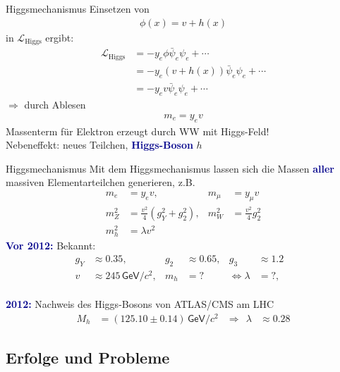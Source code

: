 \documentclass[hyperref={pdfpagelabels=false},ngerman]{beamer}
\newcommand{\eh}[1]{\,\mathsf{#1}}
\newcommand{\Lagr}{\mathcal{L}}
\renewcommand{\emph}[1]{\textbf{\textcolor{darkblue}{#1}}}
\newcommand{\GeV}{\eh{GeV}}
\begin{document}
\begin{frame}{Higgsmechanismus}
  Einsetzen von
  \begin{align*}
    \phi(x) = v + h(x)
  \end{align*}
  in $\Lagr_{\text{Higgs}}$ ergibt:
  \begin{align*}
    \Lagr_{\text{Higgs}}
    &= - y_e \phi \bar{\psi}_e \psi_e + \cdots \\
    &= - y_e (v + h(x)) \bar{\psi}_e \psi_e + \cdots \\
    &= - y_e v \bar{\psi}_e \psi_e + \cdots
  \end{align*}
  $\Rightarrow$ durch Ablesen
  \begin{align*}
    m_e = y_e v
  \end{align*}
  Massenterm für Elektron erzeugt durch WW mit Higgs-Feld!\\
  Nebeneffekt: neues Teilchen, \emph{Higgs-Boson} $h$
\end{frame}

\begin{frame}{Higgsmechanismus}
  Mit dem Higgsmechanismus lassen sich die Massen \emph{aller}
  massiven Elementarteilchen generieren, z.B.
  \begin{align*}
    m_e &= y_e v, & m_\mu &= y_\mu v \\
    m_Z^2 &= \frac{v^2}{4}(g_Y^2 + g_2^2) , &  m_W^2 &= \frac{v^2}{4} g_2^2 \\
    m_h^2 &= \lambda v^2
  \end{align*}
  \emph{Vor 2012:}
  Bekannt:
  \begin{align*}
    g_Y &\approx 0.35, &
    g_2 &\approx 0.65, &
    g_3 &\approx 1.2 \\
    v &\approx 245\GeV/c^2, &
    m_h &={} ? &
    \Leftrightarrow \lambda &={} ?, &
  \end{align*}
  \\[1em]
  \emph{2012:} Nachweis des Higgs-Bosons von ATLAS/CMS am LHC
  \begin{align*}
    M_h &= (125.10\pm 0.14) \GeV/c^2 &
    \Rightarrow \ \ \lambda &\approx 0.28
  \end{align*}
\end{frame}

\subsection{Erfolge und Probleme}
\end{document}
